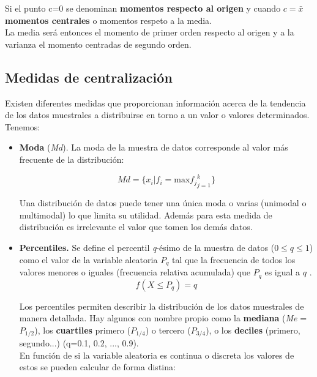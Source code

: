\documentclass[12pt,a4paper]{book}
\begin{document}
Si el punto c=0 se denominan \textbf{momentos respecto al origen} y cuando $c=\bar{x}$ \textbf{momentos centrales} o momentos respeto a la media. \\

La media será entonces el momento de primer orden respecto al origen y a la varianza el momento centradas de segundo orden. 

\subsection{Medidas de centralización}

Existen diferentes medidas que proporcionan información acerca de la tendencia de los datos muestrales a distribuirse en torno a un valor o valores determinados. Tenemos:

\begin{itemize}

\item \textbf{Moda} (\textit{Md}). La moda de la muestra de datos corresponde al valor más frecuente de la distribución: 

\begin{equation}
Md = \{ x_i | f_i = \mathrm{max}{f_j}_{j=1}^k\}
\end{equation}

Una distribución de datos puede tener una única moda o varias (unimodal o multimodal) lo que limita su utilidad. Además para esta medida de distribución es irrelevante el valor que tomen los demás datos. 


\item \textbf{Percentiles.} Se define el percentil \textit{q}-ésimo de la muestra de datos ($0 \leq q \leq 1$) como el valor de la variable aleatoria $P_q$ tal que la frecuencia de todos los valores menores o iguales (frecuencia relativa acumulada) que $P_q$ es igual a $q$ . \\

\begin{equation}
f(X \leq P_q) = q
\end{equation}

Los percentiles permiten describir la distribución de los datos muestrales de manera detallada. Hay algunos con nombre propio como la \textbf{mediana} (\textit{Me} = $P_{1/2}$), los \textbf{cuartiles} primero ($P_{1/4}$) o tercero ($P_{3/4}$), o los \textbf{deciles} (primero, segundo...) (q=0.1, 0.2, ..., 0.9). \\

En función de si la variable aleatoria es continua o discreta los valores de estos se pueden calcular de forma distina: 


\end{itemize}
\end{document}
